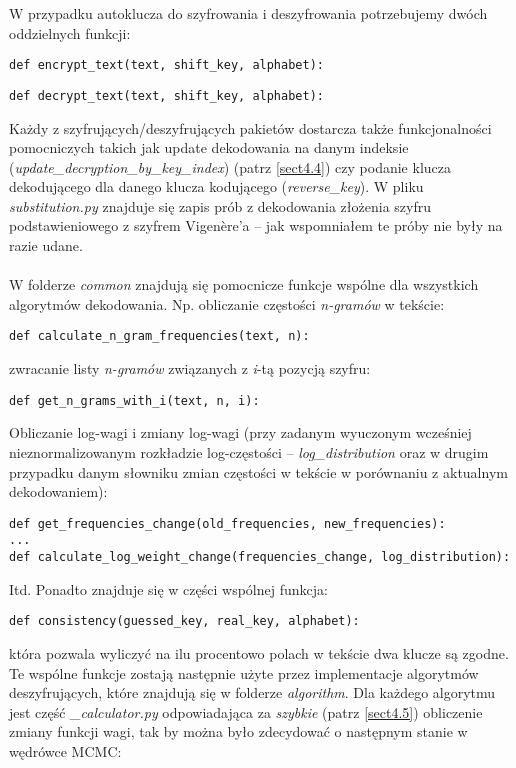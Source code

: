 \documentclass[a4paper]{article}
\theoremstyle{defn}
\theoremstyle{theorem}
\theoremstyle{lemma}
\theoremstyle{cor}
\theoremstyle{fact}
\begin{document}
W przypadku autoklucza do szyfrowania i deszyfrowania potrzebujemy dwóch oddzielnych funkcji:
\begin{lstlisting}
def encrypt_text(text, shift_key, alphabet):
\end{lstlisting}
\begin{lstlisting}
def decrypt_text(text, shift_key, alphabet):
\end{lstlisting}
Każdy z szyfrujących/deszyfrujących pakietów dostarcza także funkcjonalności pomocniczych takich jak update dekodowania na danym indeksie (\textit{update\_decryption\_by\_key\_index}) (patrz \ref{sect4.4}) czy podanie klucza dekodującego dla danego klucza kodującego (\textit{reverse\_key}). W pliku \textit{substitution.py} znajduje się zapis prób z dekodowania złożenia szyfru podstawieniowego z szyfrem Vigenère'a – jak wspomniałem te próby nie były na razie udane.\\\\
W folderze \textit{common} znajdują się pomocnicze funkcje wspólne dla wszystkich algorytmów dekodowania. Np. obliczanie częstości \textit{n-gramów} w tekście:
\begin{lstlisting}
def calculate_n_gram_frequencies(text, n):
\end{lstlisting}
zwracanie listy \textit{n-gramów} związanych z \textit{i}-tą pozycją szyfru:
\begin{lstlisting}
def get_n_grams_with_i(text, n, i):
\end{lstlisting}
Obliczanie log-wagi i zmiany log-wagi (przy zadanym wyuczonym wcześniej nieznormalizowanym rozkładzie log-częstości – \textit{log\_distribution} oraz w drugim przypadku danym słowniku zmian częstości w tekście w porównaniu z aktualnym dekodowaniem):
\begin{lstlisting}
def get_frequencies_change(old_frequencies, new_frequencies):
...
def calculate_log_weight_change(frequencies_change, log_distribution):
\end{lstlisting}
Itd. Ponadto znajduje się w części wspólnej funkcja:
\begin{lstlisting}
def consistency(guessed_key, real_key, alphabet):
\end{lstlisting}
która pozwala wyliczyć na ilu procentowo polach w tekście dwa klucze są zgodne.\\
Te wspólne funkcje zostają następnie użyte przez implementacje algorytmów deszyfrujących, które znajdują się w folderze \textit{algorithm}. Dla każdego algorytmu jest część \textit{\_calculator.py} odpowiadająca za \textit{szybkie} (patrz \ref{sect4.5}) obliczenie zmiany funkcji wagi, tak by można było zdecydować o następnym stanie w wędrówce MCMC:
\end{document}
